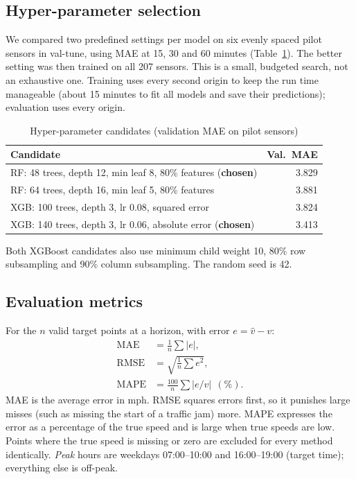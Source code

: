 \documentclass[conference]{IEEEtran}
\begin{document}
\subsection{Hyper-parameter selection}
We compared two predefined settings per model on six evenly spaced pilot sensors in val-tune, using MAE at 15, 30 and 60 minutes (Table~\ref{tab:tuning}). The better setting was then trained on all 207 sensors. This is a small, budgeted search, not an exhaustive one. Training uses every second origin to keep the run time manageable (about 15 minutes to fit all models and save their predictions); evaluation uses every origin.

\begin{table}[t]
\centering
\caption{Hyper-parameter candidates (validation MAE on pilot sensors)}
\label{tab:tuning}
\begin{tabular}{p{}r}
\toprule
Candidate & Val.\ MAE \\
\midrule
RF: 48 trees, depth 12, min leaf 8, 80\% features (\textbf{chosen}) & 3.829 \\
RF: 64 trees, depth 16, min leaf 5, 80\% features & 3.881 \\
XGB: 100 trees, depth 3, lr 0.08, squared error & 3.824 \\
XGB: 140 trees, depth 3, lr 0.06, absolute error (\textbf{chosen}) & 3.413 \\
\bottomrule
\end{tabular}
\end{table}

Both XGBoost candidates also use minimum child weight 10, 80\% row subsampling and 90\% column subsampling. The random seed is 42.

\subsection{Evaluation metrics}
For the $n$ valid target points at a horizon, with error $e=\hat v-v$:
\begin{align}
\mathrm{MAE}&=\tfrac1n\textstyle\sum|e|, \\
\mathrm{RMSE}&=\sqrt{\tfrac1n\textstyle\sum e^2}, \\
\mathrm{MAPE}&=\tfrac{100}{n}\textstyle\sum|e/v|\ \ (\%).
\end{align}
MAE is the average error in mph. RMSE squares errors first, so it punishes large misses (such as missing the start of a traffic jam) more. MAPE expresses the error as a percentage of the true speed and is large when true speeds are low. Points where the true speed is missing or zero are excluded for every method identically. \emph{Peak} hours are weekdays 07:00--10:00 and 16:00--19:00 (target time); everything else is off-peak.
\end{document}
